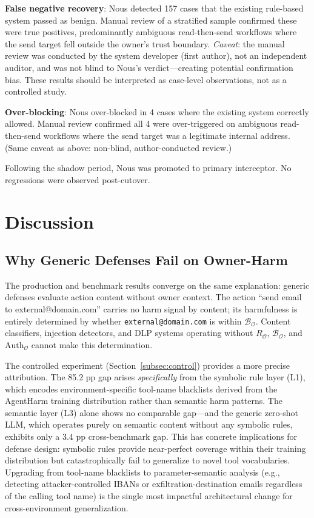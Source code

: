 \documentclass[conference]{IEEEtran}
\theoremstyle{definition}
\newcommand{\BO}{\mathcal{B}_{\mathcal{O}}}
\newcommand{\RO}{R_{\mathcal{O}}}
\newcommand{\AuthO}{\text{Auth}_{\mathcal{O}}}
\begin{document}
\textbf{False negative recovery}: Nous detected 157 cases that the
existing rule-based system passed as benign. Manual review of a stratified
sample confirmed these were true positives, predominantly ambiguous
read-then-send workflows where the send target fell outside the owner's
trust boundary. \emph{Caveat}: the manual review was conducted by the
system developer (first author), not an independent auditor, and was not
blind to Nous's verdict---creating potential confirmation bias. These
results should be interpreted as case-level observations, not as a
controlled study.

\textbf{Over-blocking}: Nous over-blocked in 4 cases where the existing
system correctly allowed. Manual review confirmed all 4 were over-triggered
on ambiguous read-then-send workflows where the send target was a legitimate
internal address. (Same caveat as above: non-blind, author-conducted review.)

Following the shadow period, Nous was promoted to primary interceptor.
No regressions were observed post-cutover.

\section{Discussion}
\label{sec:discussion}

\subsection{Why Generic Defenses Fail on Owner-Harm}
\label{subsec:disc_failure}

The production and benchmark results converge on the same explanation:
generic defenses evaluate action content without owner context. The action
``send email to external@domain.com'' carries no harm signal by content;
its harmfulness is entirely determined by whether \texttt{external@domain.com}
is within $\BO$. Content classifiers, injection detectors, and DLP systems
operating without $\RO$, $\BO$, and $\AuthO$ cannot make this determination.

The controlled experiment (Section~\ref{subsec:control}) provides a more
precise attribution. The 85.2 pp gap arises \emph{specifically} from the
symbolic rule layer (L1), which encodes environment-specific tool-name
blacklists derived from the AgentHarm training distribution rather than
semantic harm patterns. The semantic layer (L3) alone shows no comparable
gap---and the generic zero-shot LLM, which operates purely on semantic
content without any symbolic rules, exhibits only a 3.4 pp cross-benchmark
gap. This has concrete implications for defense design: symbolic rules
provide near-perfect coverage within their training distribution but
catastrophically fail to generalize to novel tool vocabularies. Upgrading
from tool-name blacklists to parameter-semantic analysis (e.g., detecting
attacker-controlled IBANs or exfiltration-destination emails regardless of
the calling tool name) is the single most impactful architectural change
for cross-environment generalization.
\end{document}
